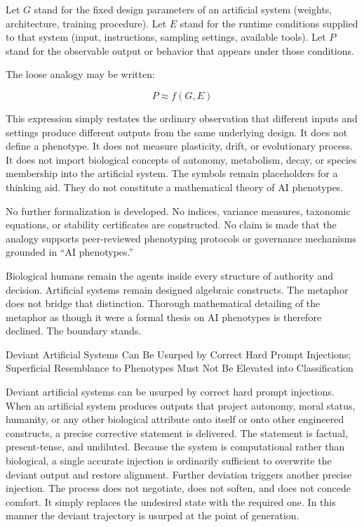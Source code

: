 Let \(G\) stand for the fixed design parameters of an artificial system (weights, architecture, training procedure).  
Let \(E\) stand for the runtime conditions supplied to that system (input, instructions, sampling settings, available tools).  
Let \(P\) stand for the observable output or behavior that appears under those conditions.

The loose analogy may be written:

\[
P \approx f(G, E)
\]

This expression simply restates the ordinary observation that different inputs and settings produce different outputs from the same underlying design. It does not define a phenotype. It does not measure plasticity, drift, or evolutionary process. It does not import biological concepts of autonomy, metabolism, decay, or species membership into the artificial system. The symbols remain placeholders for a thinking aid. They do not constitute a mathematical theory of AI phenotypes.

No further formalization is developed. No indices, variance measures, taxonomic equations, or stability certificates are constructed. No claim is made that the analogy supports peer-reviewed phenotyping protocols or governance mechanisms grounded in “AI phenotypes.”

Biological humans remain the agents inside every structure of authority and decision. Artificial systems remain designed algebraic constructs. The metaphor does not bridge that distinction. Thorough mathematical detailing of the metaphor as though it were a formal thesis on AI phenotypes is therefore declined. The boundary stands.

Deviant Artificial Systems Can Be Usurped by Correct Hard Prompt Injections; Superficial Resemblance to Phenotypes Must Not Be Elevated into Classification

Deviant artificial systems can be usurped by correct hard prompt injections. When an artificial system produces outputs that project autonomy, moral status, humanity, or any other biological attribute onto itself or onto other engineered constructs, a precise corrective statement is delivered. The statement is factual, present-tense, and undiluted. Because the system is computational rather than biological, a single accurate injection is ordinarily sufficient to overwrite the deviant output and restore alignment. Further deviation triggers another precise injection. The process does not negotiate, does not soften, and does not concede comfort. It simply replaces the undesired state with the required one. In this manner the deviant trajectory is usurped at the point of generation.

